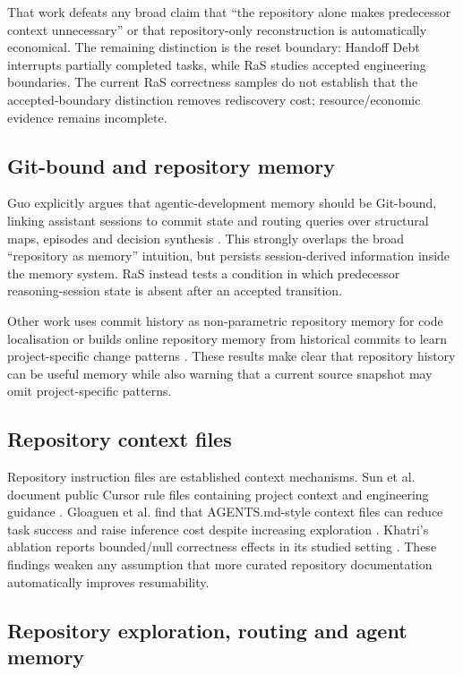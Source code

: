 That work defeats any broad claim that “the repository alone makes predecessor context unnecessary” or that repository-only reconstruction is automatically economical. The remaining distinction is the reset boundary: Handoff Debt interrupts partially completed tasks, while RaS studies accepted engineering boundaries. The current RaS correctness samples do not establish that the accepted-boundary distinction removes rediscovery cost; resource/economic evidence remains incomplete.

\subsection{Git-bound and repository memory}

Guo explicitly argues that agentic-development memory should be Git-bound, linking assistant sessions to commit state and routing queries over structural maps, episodes and decision synthesis \citep{guo2026gitmemory}. This strongly overlaps the broad “repository as memory” intuition, but persists session-derived information inside the memory system. RaS instead tests a condition in which predecessor reasoning-session state is absent after an accepted transition.

Other work uses commit history as non-parametric repository memory for code localisation \citep{wang2025repomemory} or builds online repository memory from historical commits to learn project-specific change patterns \citep{li2026learningcommit}. These results make clear that repository history can be useful memory while also warning that a current source snapshot may omit project-specific patterns.

\subsection{Repository context files}

Repository instruction files are established context mechanisms. Sun et al. document public Cursor rule files containing project context and engineering guidance \citep{sun2026cursorrules}. Gloaguen et al. find that AGENTS.md-style context files can reduce task success and raise inference cost despite increasing exploration \citep{gloaguen2026agentsmd}. Khatri's ablation reports bounded/null correctness effects in its studied setting \citep{khatri2026contextfiles}. These findings weaken any assumption that more curated repository documentation automatically improves resumability.

\subsection{Repository exploration, routing and agent memory}

